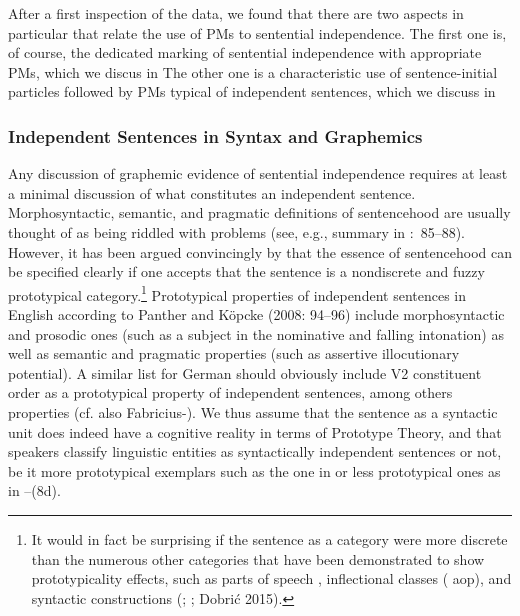 After a first inspection of the data, we found that there are two aspects in particular that relate the use of PMs to sentential independence. The first one is, of course, the dedicated marking of sentential independence with appropriate PMs, which we discus in  The other one is a characteristic use of sentence-initial particles followed by PMs typical of independent sentences, which we discuss in 



\subsubsection{Independent Sentences in Syntax and Graphemics}



Any discussion of graphemic evidence of sentential independence requires at least a minimal discussion of what constitutes an independent sentence. Morphosyntactic, semantic, and pragmatic definitions of sentencehood are usually thought of as being riddled with problems (see, e.g., summary in \citealt{PantherKöpcke2008}:~85–88). However, it has been argued convincingly by \citet{PantherKöpcke2008} that the essence of sentencehood can be specified clearly if one accepts that the sentence is a nondiscrete and fuzzy prototypical category.\footnote{It would in fact be surprising if the sentence as a category were more discrete than the numerous other categories that have been demonstrated to show prototypicality effects, such as parts of speech \citep{Uehara2003}, inflectional classes (\citealt{Schäfer2016} aop), and syntactic constructions (\citealt{Gries2003}; \citealt{DivjakArppe2013}; Dobrić 2015).} Prototypical properties of independent sentences in English according to Panther and Köpcke (2008: 94–96) include morphosyntactic and prosodic ones (such as a subject in the nominative and falling intonation) as well as semantic and pragmatic properties (such as assertive illocutionary potential). A similar list for German should obviously include V2 constituent order as a prototypical property of independent sentences, among others properties (cf. also Fabricius-\citealt{Hansen2011}). We thus assume that the sentence as a syntactic unit does indeed have a cognitive reality in terms of Prototype Theory, and that speakers classify linguistic entities as syntactically independent sentences or not, be it more prototypical exemplars such as the one in  or less prototypical ones as in –(8d).



